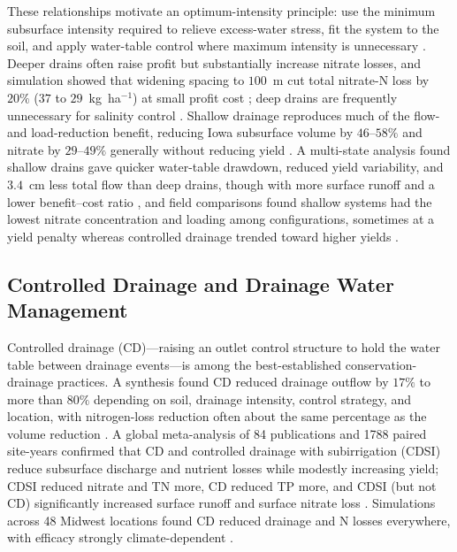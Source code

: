 These relationships motivate an optimum-intensity principle: use the minimum
subsurface intensity required to relieve excess-water stress, fit the system to
the soil, and apply water-table control where maximum intensity is unnecessary
\parencite{Breve1998}. Deeper drains often raise profit but substantially
increase nitrate losses, and simulation showed that widening spacing to $100$~m
cut total nitrate-N loss by $20\%$ ($37$ to $29$~kg~ha$^{-1}$) at small profit
cost \parencite{ElSadek2002b,Breve1998}; deep drains are frequently unnecessary
for salinity control \parencite{Ritzema2011}. Shallow drainage reproduces much
of the flow- and load-reduction benefit, reducing Iowa subsurface volume by
$46$--$58\%$ and nitrate by $29$--$49\%$ generally without reducing yield
\parencite{Helmers2012,Schott2017}. A multi-state analysis found shallow drains
gave quicker water-table drawdown, reduced yield variability, and $3.4$~cm less
total flow than deep drains, though with more surface runoff and a lower
benefit--cost ratio \parencite{Ghane2021b}, and field comparisons found shallow
systems had the lowest nitrate concentration and loading among configurations,
sometimes at a yield penalty whereas controlled drainage trended toward higher
yields \parencite{Smith2019,Smith2011b}.

\subsection{Controlled Drainage and Drainage Water Management}

Controlled drainage (CD)---raising an outlet control structure to hold the
water table between drainage events---is among the best-established
conservation-drainage practices. A synthesis found CD reduced drainage outflow
by $17\%$ to more than $80\%$ depending on soil, drainage intensity, control
strategy, and location, with nitrogen-loss reduction often about the same
percentage as the volume reduction \parencite{Skaggs2010}. A global
meta-analysis of 84 publications and 1788 paired site-years confirmed that CD
and controlled drainage with subirrigation (CDSI) reduce subsurface discharge
and nutrient losses while modestly increasing yield; CDSI reduced nitrate and
TN more, CD reduced TP more, and CDSI (but not CD) significantly increased
surface runoff and surface nitrate loss \parencite{Wu2025}. Simulations across
48 Midwest locations found CD reduced drainage and N losses everywhere, with
efficacy strongly climate-dependent \parencite{Youssef2018}.

